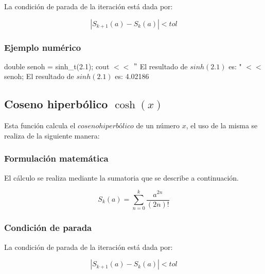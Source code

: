 \documentclass[10pt,a4paper]{article}
\begin{document}
	La condición de parada de la iteración está dada por: 
	
	\begin{equation}\label{key15}
		\left\lvert S_{k+1}(a) - S_{k}(a) \right\lvert < tol
	\end{equation}
		
	\subsubsection{Ejemplo numérico}

	double senoh = sinh{\_}t(2.1); \newline
	cout $<<$ $"$ El resultado de $sinh(2.1)$ es: " $<<$ senoh; \newline
	El resultado de $sinh(2.1)$ es: 4.02186\newline
	
	\subsection{Coseno hiperbólico $\cosh(x)$}
	
	Esta función calcula el $coseno hiperbólico$ de un número $x$, el uso de la misma se realiza de la siguiente manera:
	
	\begin{center}
	\end{center}
	
	\subsubsection{Formulación matemática}

	El cálculo se realiza mediante la sumatoria que se describe a continuación.

	\begin{equation}\label{key16}
		S_{k}(a) = \sum_{n=0}^{k}\frac{a^{2n}}{(2n)!}
	\end{equation}

	\subsubsection{Condición de parada}

	La condición de parada de la iteración está dada por: 

	\begin{equation}\label{key17}
		\left\lvert S_{k+1}(a) - S_{k}(a) \right\lvert < tol
	\end{equation}
	
\end{document}
